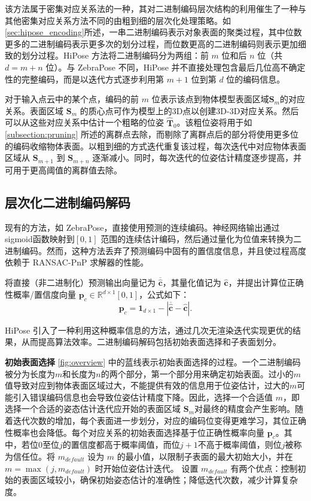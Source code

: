 该方法属于密集对应关系法的一种，其对二进制编码层次结构的利用催生了一种与其他密集对应关系方法不同的由粗到细的层次化处理策略。如\autoref{sec:hipose_encoding}所述，一串二进制编码表示对象表面的聚类过程，其中位数更多的二进制编码表示更多次的划分过程，而位数更高的二进制编码则表示更加细致的划分过程。HiPose 方法将二进制编码分为两组：前 $m$ 位和后 $n$ 位（共 $d=m+n$ 位）。与 ZebraPose\cite{su2022zebrapose} 不同，HiPose 并不直接处理包含最后几位高不确定性的完整编码，而是以迭代方式逐步利用第 ${m+1}$ 位到第 $d$ 位的编码信息。

对于输入点云中的某个点，编码的前 $m$ 位表示该点到物体模型表面区域$\bm{S}_{m}$的对应关系。表面区域 $\bm{S}_{m}$ 的质心点可作为模型上的3D点以创建3D-3D对应关系。然后可以从这些对应关系中估计一个粗略的位姿 $\hat{\bm{T}}_{0}$。该粗位姿将用于如\autoref{subsection:pruning} 所述的离群点去除，而剔除了离群点后的部分将使用更多位的编码收缩物体表面。以粗到细的方式迭代重复该过程，每次迭代中对应物体表面区域从 $\bm{S}_{m+1}$ 到 $\bm{S}_{m+n}$ 逐渐减小。同时，每次迭代的位姿估计精度逐步提高，并可用于更高阈值的离群值去除。

\subsection{层次化二进制编码解码}
\label{subsection:solver}
现有的方法，如 ZebraPose\cite{su2022zebrapose}，直接使用预测的连续编码。神经网络输出通过sigmoid函数映射到$[0,1]$ 范围的连续估计编码，然后通过量化为位值来转换为二进制编码。然而，这种方法丢弃了预测编码中固有的置信度信息，并且使过程高度依赖于 RANSAC-PnP 求解器的性能。

将直接（非二进制化）预测输出向量记为 $\overline{\hat{\bm{c}}}$，其量化值记为 $\hat{\bm{c}}$，并提出计算位正确性概率/置信度向量 $\bm{p}_{c} \in \mathbb{R}^{d\times1}{[0,1]}$，公式如下： 
\begin{equation}
    \bm{p}_{c} = \bm{1}_{d\times1} - |\overline{\hat{\bm{c}}} - \hat{\bm{c}}|. 
\end{equation} 

HiPose 引入了一种利用这种概率信息的方法，通过几次无渲染迭代实现更优的结果，从而提高算法效率。二进制编码解码包括初始表面选择和子表面划分。

\textbf{初始表面选择} \autoref{fig:overview} 中的蓝线表示初始表面选择的过程。一个二进制编码被分为长度为$m$和长度为$n$的两个部分，第一个部分用来确定初始表面。过小的$m$值导致对应到物体表面区域过大，不能提供有效的信息用于位姿估计，过大的$m$可能引入错误编码信息也会导致位姿估计精度下降。因此，选择一个合适值 $m$，即选择一个合适的姿态估计迭代应开始的表面区域 $\bm{S}_{m}$对最终的精度会产生影响。随着迭代次数的增加，每个表面进一步划分，对应的编码位变得更难学习，其位正确性概率也会降低。每个对应关系的初始表面选择基于位正确性概率向量 $\bm{p}_{c}$。其中，若位$0$至位$j$的置信度都高于概率阈值，而位$j+1$不高于概率阈值，则位$j$被称为信任位。将 $m_{default}$ 设为 $m$ 的最小值，以限制子表面的最大初始大小，并在 $m = \max(j, m_{default})$ 时开始位姿估计迭代。
设置 $m_{default}$ 有两个优点：控制初始的表面区域较小，确保初始姿态估计的准确性；降低迭代次数，减少计算复杂度。

